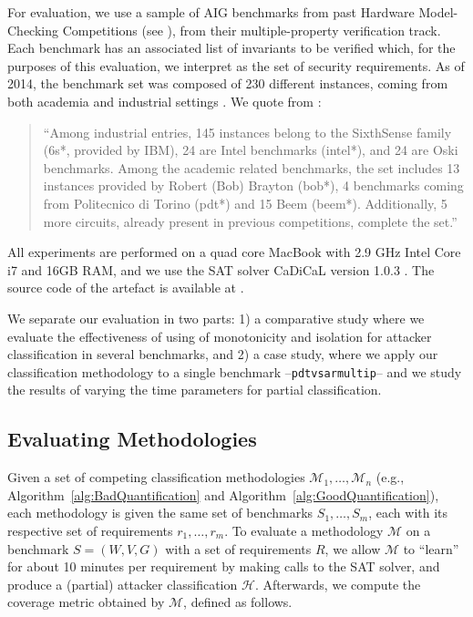 {For evaluation, we use a sample of AIG benchmarks from past Hardware Model-Checking Competitions (see \cite{HWMCC2011,HWMCC2013}), from their multiple-property verification track. Each benchmark has an associated list of invariants to be verified which, for the purposes of this evaluation, we interpret as the set of security requirements. As of 2014, the benchmark set was composed of 230 different instances, coming from both academia and industrial settings \cite{HWMCC2014BM}. We quote from \cite{HWMCC2014BM}:
\begin{quote}
``Among industrial entries, 145 instances
belong to the SixthSense family (6s*, provided by IBM), 24 are Intel benchmarks (intel*),
and 24 are Oski benchmarks. Among the academic related benchmarks, the set includes 13
instances provided by Robert (Bob) Brayton (bob*), 4 benchmarks coming from Politecnico
di Torino (pdt*) and 15 Beem (beem*). Additionally, 5 more circuits, already present in
previous competitions, complete the set.''
\end{quote}
All experiments are performed on a quad core MacBook with 2.9 GHz Intel Core i7 and 16GB RAM, and we use the SAT solver CaDiCaL version 1.0.3 \cite{Cadical}. The source code of the artefact is available at \cite{aig-ac-asset}.

We separate our evaluation in two parts: 1) a comparative study where we evaluate the effectiveness of using of monotonicity and isolation for attacker classification in several benchmarks, and 2) a case study, where we apply our classification methodology to a single benchmark --\texttt{pdtvsarmultip}-- and we study the results of varying the time parameters for partial classification.

\subsection{Evaluating Methodologies}
Given a set of competing classification methodologies $\mathcal{M}_1,\ldots, \mathcal{M}_n$ (e.g., Algorithm~\ref{alg:BadQuantification} and Algorithm~\ref{alg:GoodQuantification}), each methodology is given the same set of benchmarks $S_1,\ldots, S_m$, each with its respective set of requirements $r_1, \ldots, r_m$. To evaluate a methodology $\mathcal{M}$ on a benchmark $S=(W,V,G)$ with a set of requirements $R$, we allow $\mathcal{M}$ to ``learn'' for about 10 minutes per requirement by making calls to the SAT solver, and produce a (partial) attacker classification $\mathcal{H}$.  Afterwards, we compute the coverage metric obtained by $\mathcal{M}$, defined as follows.

}
